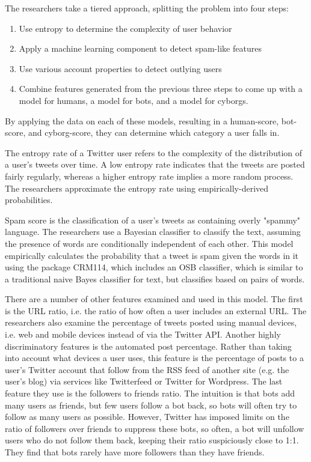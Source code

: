 \documentclass[11pt, oneside]{article}   	%
\begin{document}
\quad The researchers take a tiered approach, splitting the problem into four steps:
\begin{enumerate}
	\item Use entropy to determine the complexity of user behavior
	\item Apply a machine learning component to detect spam-like features
	\item Use various account properties to detect outlying users
	\item Combine features generated from the previous three steps to come up with a model for humans, a model for bots, and a model for cyborgs. 
\end{enumerate}	
By applying the data on each of these models, resulting in a human-score, bot-score, and cyborg-score, they can determine which category a user falls in.

\quad The entropy rate of a Twitter user refers to the complexity of the distribution of a user's tweets over time.
A low entropy rate indicates that the tweets are posted fairly regularly, whereas a higher entropy rate implies a more random process.
The researchers approximate the entropy rate using empirically-derived probabilities.

\quad Spam score is the classification of a user's tweets as containing overly "spammy" language.
The researchers use a Bayesian classifier to classify the text, assuming the presence of words are conditionally independent of each other.
This model empirically calculates the probability that a tweet is spam given the words in it using the package CRM114, which includes an OSB classifier, which is similar to a traditional naive Bayes classifier for text, but classifies based on pairs of words.

\quad There are a number of other features examined and used in this model.
The first is the URL ratio, i.e. the ratio of how often a user includes an external URL.
The researchers also examine the percentage of tweets posted using manual devices, i.e. web and mobile devices instead of via the Twitter API.
Another highly discriminatory features is the automated post percentage.
Rather than taking into account what devices a user uses, this feature is the percentage of posts to a user's Twitter account that follow from the RSS feed of another site (e.g. the user's blog) via services like Twitterfeed or Twitter for Wordpress.
The last feature they use is the followers to friends ratio.
The intuition is that bots add many users as friends, but few users follow a bot back, so bots will often try to follow as many users as possible.
However, Twitter has imposed limits on the ratio of followers over friends to suppress these bots, so often, a bot will unfollow users who do not follow them back, keeping their ratio suspiciously close to 1:1.
They find that bots rarely have more followers than they have friends.
\end{document}
